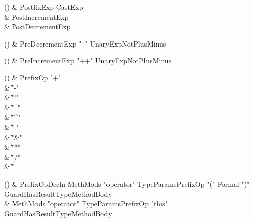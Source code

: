 \begin{bbgrammarappendix}

() & PostfixExp \label{prod:PostfixExp}  \: CastExp  \\

 &    \| PostIncrementExp \\
 &    \| PostDecrementExp \\

\end{bbgrammarappendix}

\begin{bbgrammarappendix}

() & PreDecrementExp \label{prod:PreDecrementExp}  \: \xcd"--" UnaryExpNotPlusMinus  \\


\end{bbgrammarappendix}

\begin{bbgrammarappendix}

() & PreIncrementExp \label{prod:PreIncrementExp}  \: \xcd"++" UnaryExpNotPlusMinus  \\


\end{bbgrammarappendix}

\begin{bbgrammarappendix}

() & PrefixOp \label{prod:PrefixOp}  \: \xcd"+"  \\

 &    \| \xcd"-" \\
 &    \| \xcd"!" \\
 &    \| \xcd"~" \\
 &    \| \xcd"^" \\
 &    \| \xcd"|" \\
 &    \| \xcd"&" \\
 &    \| \xcd"*" \\
 &    \| \xcd"/" \\
 &    \| \xcd"%

\end{bbgrammarappendix}

\begin{bbgrammarappendix}

() & PrefixOpDecln \label{prod:PrefixOpDecln}  \: MethMods \xcd"operator" TypeParams\opt PrefixOp \xcd"(" Formal  \xcd")" Guard\opt HasResultType\opt MethodBody  \\

 &    \| MethMods \xcd"operator" TypeParams\opt PrefixOp \xcd"this" Guard\opt HasResultType\opt MethodBody \\

\end{bbgrammarappendix}

